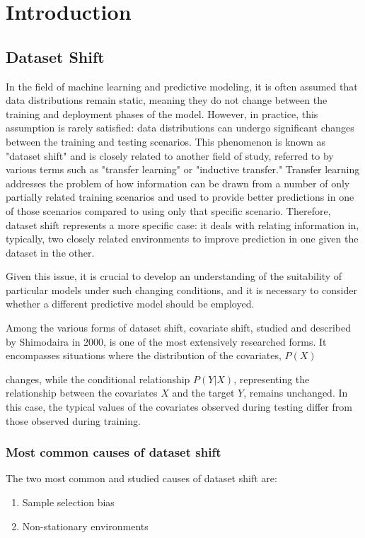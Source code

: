\chapter{Introduction}

\section{Dataset Shift}

In the field of machine learning and predictive modeling, it is often assumed that data distributions remain static, meaning they do not change between the training and deployment phases of the model. However, in practice, this assumption is rarely satisfied: data distributions can undergo significant changes between the training and testing scenarios. This phenomenon is known as "dataset shift" and is closely related to another field of study, referred to by various terms such as "transfer learning" or "inductive transfer." Transfer learning addresses the problem of how information can be drawn from a number of only partially related training scenarios and used to provide better predictions in one of those scenarios compared to using only that specific scenario. Therefore, dataset shift represents a more specific case: it deals with relating information in, typically, two closely related environments to improve prediction in one given the dataset in the other.

Given this issue, it is crucial to develop an understanding of the suitability of particular models under such changing conditions, and it is necessary to consider whether a different predictive model should be employed.

Among the various forms of dataset shift, covariate shift, studied and described by Shimodaira in 2000, is one of the most extensively researched forms. It encompasses situations where the distribution of the covariates, $𝑃(X)$

changes, while the conditional relationship $P(Y|X)$, representing the relationship between the covariates $X$ and the target $Y$, remains unchanged. In this case, the typical values of the covariates observed during testing differ from those observed during training.

\subsection{Most common causes of dataset shift}
	
The two most common and studied causes of dataset shift are:
\begin{enumerate}
\item Sample selection bias
\item Non-stationary environments
\end{enumerate}

